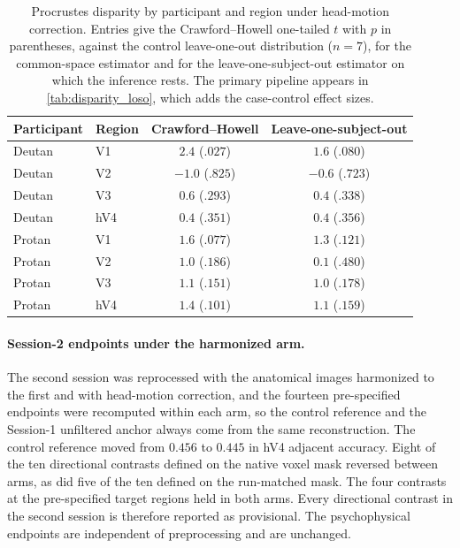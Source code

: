 \begin{table}[h]
\centering
\caption{Procrustes disparity by participant and region under head-motion correction. Entries give the Crawford--Howell one-tailed $t$ with $p$ in parentheses, against the control leave-one-out distribution ($n = 7$), for the common-space estimator and for the leave-one-subject-out estimator on which the inference rests. The primary pipeline appears in \cref{tab:disparity_loso}, which adds the case-control effect sizes.}
\label{tab:motion_arms}
\small
\begin{tabular}{llcc}
\toprule
Participant & Region & Crawford--Howell & Leave-one-subject-out \\
\midrule
Deutan & V1  & $2.4$ ($.027$) & $1.6$ ($.080$) \\
Deutan & V2  & $-1.0$ ($.825$) & $-0.6$ ($.723$) \\
Deutan & V3  & $0.6$ ($.293$) & $0.4$ ($.338$) \\
Deutan & hV4 & $0.4$ ($.351$) & $0.4$ ($.356$) \\
Protan & V1  & $1.6$ ($.077$) & $1.3$ ($.121$) \\
Protan & V2  & $1.0$ ($.186$) & $0.1$ ($.480$) \\
Protan & V3  & $1.1$ ($.151$) & $1.0$ ($.178$) \\
Protan & hV4 & $1.4$ ($.101$) & $1.1$ ($.159$) \\
\bottomrule
\end{tabular}
\end{table}

\paragraph{Session-2 endpoints under the harmonized arm.}
The second session was reprocessed with the anatomical images harmonized to the first and with head-motion correction, and the fourteen pre-specified endpoints were recomputed within each arm, so the control reference and the Session-1 unfiltered anchor always come from the same reconstruction. The control reference moved from $0.456$ to $0.445$ in hV4 adjacent accuracy. Eight of the ten directional contrasts defined on the native voxel mask reversed between arms, as did five of the ten defined on the run-matched mask. The four contrasts at the pre-specified target regions held in both arms. Every directional contrast in the second session is therefore reported as provisional. The psychophysical endpoints are independent of preprocessing and are unchanged.

